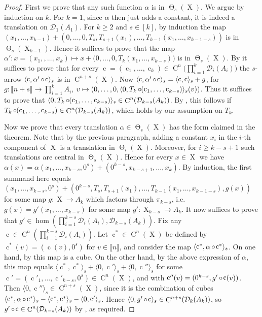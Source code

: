 \documentclass[a4paper,12pt,reqno]{amsart}
\theoremstyle{definition}
\def\to{\rightarrow}
\newcommand*{\db}[1]{\llbracket #1\rrbracket}
\newcommand{\mc}{\mathcal}
\DeclareMathOperator{\tran}{\Theta}
\DeclareMathOperator{\q}{c}
\DeclareMathOperator{\ns}{X}
\DeclareMathOperator{\co}{\circ\hspace{-0.02 cm}}
\DeclareMathOperator{\cu}{C}
\begin{document}
\begin{proof}
First we prove that any such function $\alpha$ is in $\tran_s(\ns)$. We argue by induction on $k$. For $k=1$, since  $\alpha$ then just adds a constant, it is  indeed a translation on $\mc{D}_1(A_1)$. For $k\geq 2$ and $s\in [k]$, by induction the map $(x_1,\ldots,x_{k-1})+(0,\ldots,0,T_s,T_{s+1}(x_1),\ldots,T_{k-1}(x_1,\ldots,x_{k-1-s}))$ is in $\tran_s(\ns_{k-1})$. Hence it suffices to prove that the map $\alpha': x=(x_1,,\ldots,x_k)\mapsto x+\big(0,\ldots,0,T_k(x_1,\ldots,x_{k-s})\big)$ is  in $\tran_s(\ns)$.
By \cite[Lemma 3.2.32]{Cand:Notes1} it suffices to prove that for every $\q=(\q_1,\ldots,\q_k)\in \cu^n\big(\prod_{i=1}^{k}\mc{D}_i(A_i)\big)$ the $s$-arrow $\langle \q,\alpha'\co\q\rangle_s$ is in $\cu^{n+s}(\ns)$. Now $\langle \q,\alpha'\co\q\rangle_s=\langle \q,\q\rangle_s + g$, for $g:\db{n+s}\to \prod_{i=1}^k A_i$, $v\mapsto (0,\ldots,0,\langle 0,T_k\co (\q_1,\ldots,\q_{k-s})\rangle_s(v))$. Thus it suffices to prove that $\langle 0,T_k\co (\q_1,\ldots,\q_{k-s})\rangle_s\in \cu^n(\mc{D}_{k-s}(A_k))$. By \cite[Lemma 2.2.19]{Cand:Notes1}, this follows if $T_k\co (\q_1,\ldots,\q_{k-s})\in \cu^n(\mc{D}_{k-s}(A_k))$, which holds by our assumption on $T_k$. 

Now we prove that every translation $\alpha\in \tran_s(\ns)$ has the form claimed in the theorem. Note that by the previous paragraph, adding a constant $x_i$ in the $i$-th component of $\ns$ is a translation in $\tran_i(\ns)$. Moreover, for $i\geq k-s+1$ such translations are central in $\tran_s(\ns)$. Hence for every $x\in \ns$ we have $\alpha(x)=\alpha(x_1,\ldots,x_{k-s},0^s)+(0^{k-s},x_{k-s+1},\ldots,x_k)$. By induction, the first summand here equals $(x_1,\ldots,x_{k-s},0^s)+(0^{k-s},T_s,T_{s+1}(x_1),\ldots,T_{k-1}(x_1,\ldots,x_{k-1-s}),g(x))$ for some map $g:\ns\to A_k$ which factors through $\pi_{k-s}$, i.e.\ $g(x)=g'(x_1,\ldots,x_{k-s})$ for some map $g':\ns_{k-s}\to A_k$. It now suffices to prove that $g'\in \hom(\prod_{i=1}^{k-s}\mc{D}_i(A_i),\mc{D}_{k-s}(A_k))$. Fix any $\q\in \cu^n(\prod_{i=1}^{k-s}\mc{D}_i(A_i))$. Let $\q^*\in \cu^n(\ns)$ be defined by $\q^*(v)=(\q(v),0^s)$ for $v\in\db{n}$, and consider the map $\langle\q^*,\alpha\co\q^*\rangle_s$. On one hand, by \cite[Lemma 3.2.32]{Cand:Notes1} this map is a cube. On the other hand, by the above expression of $\alpha$, this map equals $\langle\q^*,\q^*\rangle_s+\langle0,\q'\rangle_s+\langle 0,\q''\rangle_s$ for some $\q'=(\q'_1,\ldots,\q'_{k-s},0^s)\in \cu^n(\ns)$, and with $\q''(v)=(0^{k-s},g'\co \q(v))$. Then $\langle 0,\q''\rangle_s\in \cu^{n+s}(\ns)$, since it is the combination of cubes $\langle\q^*,\alpha\co\q^*\rangle_s-\langle\q^*, \q^*\rangle_s - \langle0,\q'\rangle_s$. Hence $\langle 0,g'\co\q\rangle_s\in \cu^{n+s}(\mc{D}_k(A_k))$, so $g'\co\q\in \cu^n(\mc{D}_{k-s}(A_k))$ by \cite[Lemma 2.2.19]{Cand:Notes1}, as required.
\end{proof}
\end{document}
